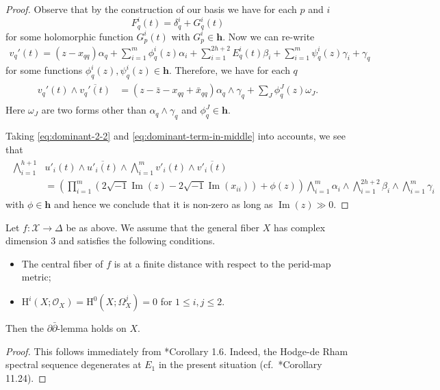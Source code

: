 \begin{proof}
Observe that by the construction of our basis we have for each \(p\) and \(i\)
\begin{equation}
F_{q}^{i}(t)=\delta_{q}^{i}+G_{q}^{i}(t)
\end{equation}
for some holomorphic function \(G_{p}^{i}(t)\) with 
\(G_{p}^{i}\in\mathbf{h}\). 
Now we can re-write
\begin{align*}
v_{q}'(t)=(z-x_{qq})\alpha_{q}+\sum_{i=1}^{m}\phi^{i}_{q}(z)\alpha_{i}
+\sum_{i=1}^{2h+2} E^{i}_{q}(t) \beta_{i} + \sum_{i=1}^{m} 
\psi_{q}^{i}(z) \gamma_{i} + \gamma_{q}
\end{align*}
for some functions \(\phi_{q}^{i}(z),\psi_{q}^{i}(z)\in\mathbf{h}\). Therefore,
we have for each \(q\)
\begin{align}
\label{eq:dominant-2-2}
\begin{split}
v_{q}'(t)\wedge\overline{v_{q}'(t)} & = (z-\bar{z}-x_{qq}+\bar{x}_{qq})
\alpha_{q}\wedge\gamma_{q} + \sum_{J}\phi_{q}^{J}(z)\omega_{J}.
\end{split}
\end{align}
Here \(\omega_{J}\) are two forms other than \(\alpha_{q}\wedge\gamma_{q}\)
and \(\phi_{q}^{J}\in \mathbf{h}\).

Taking \eqref{eq:dominant-2-2} and \eqref{eq:dominant-term-in-middle}
into accounts, we see that
\begin{align}
\begin{split}
\bigwedge_{i=1}^{h+1} &u'_{i}(t)\wedge\overline{u'_{i}(t)}\wedge
\bigwedge_{i=1}^{m} v'_{i}(t)\wedge\overline{v'_{i}(t)}\\
&=\left(\prod_{i=1}^{m}(2\sqrt{-1}\operatorname{Im}(z)-2\sqrt{-1}
\operatorname{Im}(x_{ii}))+\phi(z)
\right)
\bigwedge_{i=1}^{m}\alpha_{i}\wedge\bigwedge_{i=1}^{2h+2}\beta_{i}\wedge
\bigwedge_{i=1}^{m}\gamma_{i}
\end{split}
\end{align}
with \(\phi\in\mathbf{h}\) and hence we conclude that it is non-zero as
long as \(\operatorname{Im}(z)\gg 0\). 
\end{proof}

\begin{corollary}
\label{cor:finite-distance-ddbar}
Let \(f\colon\mathcal{X}\to\Delta\) be as above.
We assume that
the general fiber \(X\) has 
complex dimension \(3\) and satisfies the following conditions.
\begin{itemize}
\item The central fiber of \(f\) is at a finite distance with respect to
the perid-map metric;
\item \(\mathrm{H}^{i}(X;\mathcal{O}_{X})=\mathrm{H}^{0}(X;\Omega_{X}^{j})=0\)
for \(1\le i,j\le 2\).
\end{itemize}
Then the \(\partial\bar{\partial}\)-lemma holds on \(X\).
\end{corollary}
\begin{proof}
This follows immediately from \cite{2019-Friedman-the-ddbar-lemma-for-general-clemens-manifolds}*{Corollary 1.6}. Indeed, the Hodge-de Rham spectral sequence degenerates at \(E_{1}\)
in the present situation (cf.~\cite{2008-Peters-Steenbrink-mixed-Hodge-structures}*{Corollary 11.24}).
\end{proof}



